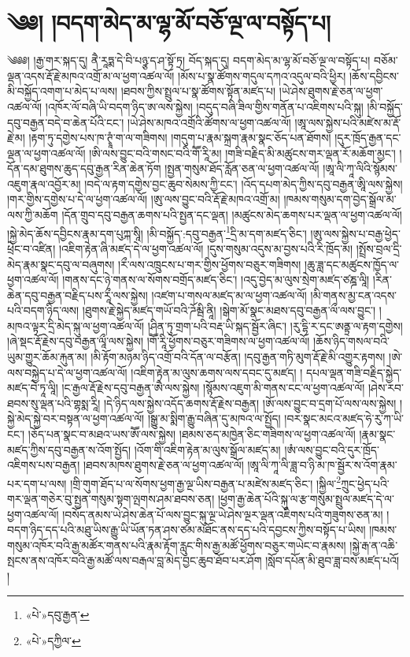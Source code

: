 \chapter{༄༅། །བདག་མེད་མ་ལྷ་མོ་བཅོ་ལྔ་ལ་བསྟོད་པ།}༄༅༅། །རྒྱ་གར་སྐད་དུ། ནཻ་རཱཏྨ་དེ་བི་པཉྩ་ད་ཤ་སྟོ་ཏྲ། བོད་སྐད་དུ། བདག་མེད་མ་ལྷ་མོ་བཅོ་ལྔ་ལ་བསྟོད་པ། བཅོམ་ལྡན་འདས་རྡོ་རྗེ་མཁའ་འགྲོ་མ་ལ་ཕྱག་འཚལ་ལོ། །མོས་པ་སྣ་ཚོགས་གདུལ་དཀའ་འདུལ་བའི་ཕྱིར། །ཆོས་དབྱིངས་མི་བསྐྱོད་འགག་པ་མེད་པ་ལས། །ཐབས་ཀྱིས་སྤྲུལ་པ་སྣ་ཚོགས་སྟོན་མཛད་པ། །ཡེ་ཤེས་ཐུགས་རྗེ་ཅན་ལ་ཕྱག་འཚལ་ལོ། །འཁོར་ལོ་བཞི་ཡི་བདག་ཉིད་ཨ་ལས་སྐྱེས། །བདུད་བཞི་ཟིལ་གྱིས་གནོན་པ་འཇིགས་པའི་སྐུ། །མི་བསྐྱོད་དབུ་བརྒྱན་བདེ་བ་ཆེན་པོའི་ངང་། །ཡེ་ཤེས་མཁའ་འགྲོའི་ཚོགས་ལ་ཕྱག་འཚལ་ལོ། །ཨཱ་ལས་སྐྱེས་པའི་མཛེས་མ་རྡོ་རྗེ་མ། །རྟག་ཏུ་དགྱེས་པས་ཁ་ཊྭཱཾ་ག་ལ་གཟིགས། །གདུག་པ་རྣམ་སྐྲག་རྣམ་སྣང་ཅོད་པན་ཐོགས། །དུར་ཁྲོད་རྒྱན་དང་ལྡན་ལ་ཕྱག་འཚལ་ལོ། །ཨི་ལས་བྱུང་བའི་གསང་བའི་གཽ་རཱི་མ། །གཟི་བརྗིད་མི་མཚུངས་གར་ལྡན་རོ་མཆོག་མྱང་། །དོན་དམ་ཐུགས་ཆུད་དབུ་རྒྱན་རིན་ཆེན་ཏོག །སྤྱན་གསུམ་ཐོད་རློན་ཅན་ལ་ཕྱག་འཚལ་ལོ། །ཨཱ་ལི་ཀཱ་ལིའི་སྙོམས་འཇུག་རྣལ་འབྱོར་མ། །བདེ་ལ་རྟག་དགྱེས་བྱང་ཆུབ་སེམས་ཀྱི་ངང་། །འོད་དཔག་མེད་ཀྱིས་དབུ་བརྒྱན་ཨཱི་ལས་སྐྱེས། །གར་གྱིས་དགྱེས་པ་དེ་ལ་ཕྱག་འཚལ་ལོ། །ཨུ་ལས་བྱུང་བའི་རྡོ་རྗེ་མཁའ་འགྲོ་མ། །ཁམས་གསུམ་དག་བྱེད་སྒྲོལ་མ་ལས་ཀྱི་མཆོག །དོན་གྲུབ་དབུ་བརྒྱན་ཆགས་པའི་སྤྱན་དང་ལྡན། །མཚུངས་མེད་ཆགས་པར་ལྡན་ལ་ཕྱག་འཚལ་ལོ། །སྐྱེ་མེད་ཆོས་དབྱིངས་རྣམ་དག་པུཀྐ་སཱི། །མི་བསྐྱོད་:དབུ་བརྒྱན་\footnote{«པེ་»དབུ་རྒྱན་}དྲི་མ་དག་མཛད་ཅིང་། །ཨུ་ལས་སྐྱེས་པ་བརྒྱ་ཕྱེད་ཕྲེང་བ་འཛིན། །འཇིག་རྟེན་ཞི་མཛད་དེ་ལ་ཕྱག་འཚལ་ལོ། །དུས་གསུམ་འདུས་མ་བྱས་པའི་རི་ཁྲོད་མ། །སྤྲོས་བྲལ་དྲི་མེད་རྣམ་སྣང་དབུ་ལ་བཞུགས། །རྀ་ལས་འཁྲུངས་པ་གར་གྱིས་ཕྱོགས་བཅུར་གཟིགས། །ཆུ་ཟླ་དང་མཚུངས་ཁྱོད་ལ་ཕྱག་འཚལ་ལོ། །གནས་དང་ཉེ་གནས་ལ་སོགས་བགྲོད་མཛད་ཅིང་། །འདུ་བྱེད་མ་ལུས་སྲེག་མཛད་ཙཎྜ་ལཱི། །རིན་ཆེན་དབུ་བརྒྱན་བརྗིད་པས་རཱྀ་ལས་སྐྱེས། །འཛག་པ་གསལ་མཛད་མ་ལ་ཕྱག་འཚལ་ལོ། །མི་གནས་མྱ་ངན་འདས་པའི་བདག་ཉིད་ལས། །ཐུགས་རྗེ་སྐྱེད་མཛད་གཡོ་བའི་ཌོམྦི་ནཱི། །སྒེག་མོ་སྣང་མཐས་དབུ་བརྒྱན་ལྀ་ལས་བྱུང་། །མཁའ་ལྟར་དྲི་མེད་སྐུ་ལ་ཕྱག་འཚལ་ལོ། །ཤིན་ཏུ་གྲག་པའི་བརྡ་ཡི་སྐད་སྦྱོར་ཞིང་། །རུ་དྷི་ར་དང་ཨནྟྲ་ལ་རྟག་དགྱེས། །ཞེ་སྡང་རྡོ་རྗེས་དབུ་བརྒྱན་ལཱྀ་ལས་སྐྱེས། །གཽ་རཱི་ཕྱོགས་བཅུར་གཟིགས་ལ་ཕྱག་འཚལ་ལོ། །ཆོས་ཉིད་གསལ་བའི་ཡུམ་གྱུར་ཆོམ་རྐུན་མ། །མི་རྟོག་མཉམ་ཉིད་འགྲོ་བའི་དོན་ལ་བརྩོན། །དབུ་རྒྱན་གཏི་མུག་རྡོ་རྗེ་མི་འགྱུར་རྟགས། །ཨེ་ལས་བསྐྱེད་པ་དེ་ལ་ཕྱག་འཚལ་ལོ། །འཇིག་རྟེན་མ་ལུས་ཆགས་ལས་དབང་དུ་མཛད། །
དཔལ་ལྡན་གཟི་བརྗིད་སྐྱེད་མཛད་བེ་ཏཱ་ལཱི། །ང་རྒྱལ་རྡོ་རྗེས་དབུ་བརྒྱན་ཨཻ་ལས་སྐྱེས། །སྙོམས་འཇུག་མི་གནས་ངང་ལ་ཕྱག་འཚལ་ལོ། །ཤེས་རབ་ཐབས་སུ་ལྡན་པའི་གྷསྨ་རཱི། །དེ་ཉིད་ལས་སྐྱེས་འདོད་ཆགས་རྡོ་རྗེས་བརྒྱན། །ཨོ་ལས་བྱུང་བ་དྲག་པོ་ལས་ལས་སྐྱེས། །སྐྱེ་མེད་སྐྱེ་བར་བསྟན་ལ་ཕྱག་འཚལ་ལོ། །སྒྱུ་མ་སྨིག་རྒྱུ་བཞིན་དུ་མཁའ་ལ་སྤྱོད། །བར་སྣང་མངའ་མཛད་ཧེ་རུ་ཀ་ཡི་ངང་། །ཅོད་པན་སྣང་བ་མཐའ་ཡས་ཨཽ་ལས་སྐྱེས། །ཐམས་ཅད་མཁྱེན་ཅིང་གཟིགས་ལ་ཕྱག་འཚལ་ལོ། །རྣམ་སྣང་མཛད་ཀྱིས་དབུ་བརྒྱན་ས་འོག་སྤྱོད། །འོག་གི་འཇིག་རྟེན་མ་ལུས་སྒྲོལ་མཛད་མ། །ཨཾ་ལས་བྱུང་བའི་དུར་ཁྲོད་འཇིགས་པས་བརྒྱན། །ཐབས་མཁས་ཐུགས་རྗེ་ཅན་ལ་ཕྱག་འཚལ་ལོ། །ཨཱ་ལི་ཀཱ་ལི་ཟླ་བ་ཉི་མ་ཁ་སྦྱོར་ས་འོག་རྣམ་པར་དག་པ་ལས། །གྲི་གུག་ཐོད་པ་ལ་སོགས་ཕྱག་རྒྱ་ལྔ་ཡིས་བརྒྱན་པ་མཛེས་མཛད་ཅིང་། །སྐྱིལ་\footnote{«པེ་»དཀྱིལ་}ཀྲུང་ཕྱེད་པའི་གར་ལྡན་གཅེར་བུ་སྤྱན་གསུམ་སྟག་ལྤགས་ཤམ་ཐབས་ཅན། །ཕྱག་རྒྱ་ཆེན་པོའི་སྐུ་ལ་རྩ་གསུམ་སྤྲུལ་མཛད་དེ་ལ་ཕྱག་འཚལ་ལོ། །བསོད་ནམས་ཡེ་ཤེས་ཆེན་པོ་ལས་བྱུང་སྐུ་ལྔ་ཡེ་ཤེས་ལྔར་ལྡན་འཇིགས་པའི་གཟུགས་ཅན་མ། །བདག་ཉིད་དད་པའི་མཐུ་ཡིས་རྒྱུ་ཡི་ཡོན་ཏན་ཤས་ཙམ་མཐོང་ནས་དད་པའི་དབྱངས་ཀྱིས་བསྟོད་པ་ཡིས། །ཁམས་གསུམ་འཁོར་བའི་རྒྱ་མཚོར་གནས་པའི་རྣམ་རྟོག་རླུང་གིས་རྒྱ་མཚོ་ཕྱོགས་བཅུར་གཡེང་བ་རྣམས། །སྐྱེ་རྒ་ན་འཆི་སྤངས་ནས་འཁོར་བའི་རྒྱ་མཚོ་ལས་བརྒལ་བླ་མེད་བྱང་ཆུབ་ཐོབ་པར་ཤོག །སློབ་དཔོན་མི་ཐུབ་ཟླ་བས་མཛད་པའོ། ། 